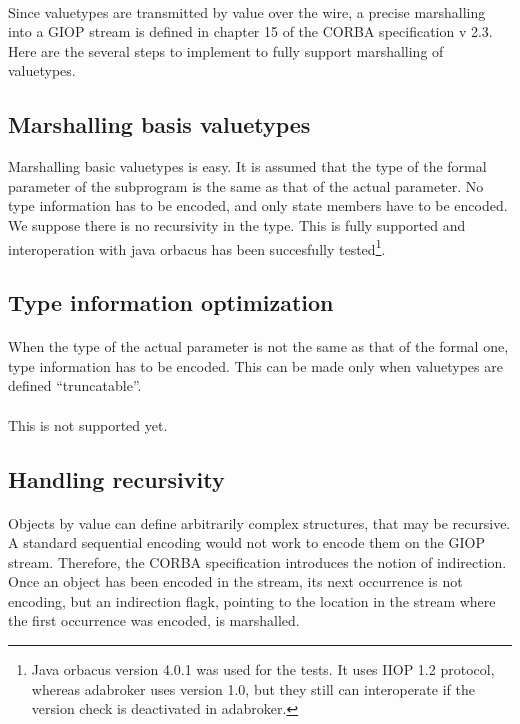 \paragraph{}Since valuetypes are transmitted by value over the wire, a
precise marshalling into a GIOP stream is defined in chapter 15 of the
CORBA specification v 2.3. Here are the several steps to implement to
fully support marshalling of valuetypes.

\subsection{Marshalling basis valuetypes}
Marshalling basic valuetypes is easy. It is assumed that the type of
the formal
parameter of the subprogram is the same as that of the actual
parameter. No type information has to be encoded, and only state
members have to be encoded. We suppose there is no recursivity in the
type. This is fully supported and interoperation with java orbacus has
been succesfully tested\footnote{Java orbacus version 4.0.1 was
used for the tests. It uses IIOP 1.2 protocol, whereas adabroker uses version 1.0,
but they still can interoperate if the version check is deactivated in
adabroker.}.

\subsection{Type information optimization}
\paragraph{}When the type of the actual parameter is not the same as
that of the formal one, type information has to be encoded. This can
be made only when valuetypes are defined ``truncatable''.

\paragraph{}This is not supported yet.

\subsection{Handling recursivity}
\paragraph{} Objects by value can define arbitrarily complex
structures, that may be recursive. A standard sequential encoding
would not work to encode them on the GIOP stream. Therefore, the CORBA
specification introduces the notion of indirection. Once an object has
been encoded in the stream, its next occurrence is not encoding, but
an indirection flagk, pointing to the location in the stream where the
first occurrence was encoded, is marshalled.

